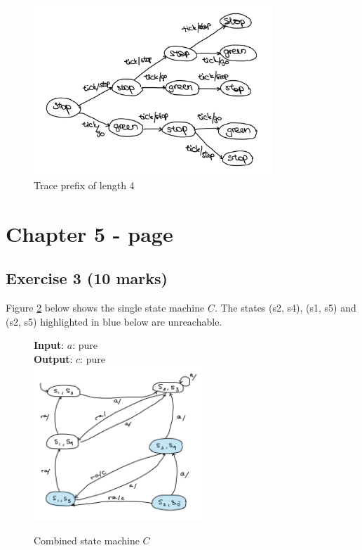 \documentclass[11pt]{article}
\begin{document}
\begin{enumerate}[label=\alph*)]
\begin{figure}[H]
    \end{figure}
    \begin{figure}[H]
    \centering
    \includegraphics[width=9cm]{Ch3Ex5.jpeg}
    \caption{Trace prefix of length 4}
    \label{fig:Ch3Ex5}
    \end{figure}
\end{enumerate}

\section*{Chapter 5 - page }
\subsection*{Exercise 3 (10 marks)}
Figure \ref{fig:Ch5Ex3} below shows the single state machine $C$. The states (s2, s4), (s1, s5) and (s2, s5) highlighted in blue below are unreachable.
\begin{figure}[H]
    \centering
    \textbf{Input}: $a$: pure\\
    \textbf{Output}: $c$: pure\\
    \includegraphics[width=6.5cm]{Ch5Ex3.jpeg}
    \caption{Combined state machine $C$}
    \label{fig:Ch5Ex3}
\end{figure}
\end{document}

